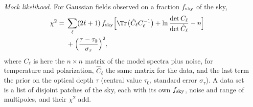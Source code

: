 \emph{Mock likelihood.} For Gaussian fields observed on a fraction $f_{\rm sky}$ of the sky,
\begin{align}
\chi^2={}&\sum_\ell(2\ell+1)\,f_{\rm sky}\Big[\Tr\big(\hat C_\ell C_\ell^{-1}\big)+\ln\frac{\det C_\ell}{\det\hat C_\ell}-n\Big]\nonumber\\
&+\Big(\frac{\tau-\tau_0}{\sigma_\tau}\Big)^2,
\label{eq:likelihood}
\end{align}
where $C_\ell$ is here the $n\times n$ matrix of the model spectra plus noise, for temperature and
polarization, $\hat C_\ell$ the same matrix for the data, and the last term the prior on the optical
depth $\tau$ (central value $\tau_0$, standard error $\sigma_\tau$). A data set is a list of disjoint patches of the sky, each with its own $f_{\rm sky}$, noise
and range of multipoles, and their $\chi^2$ add.

